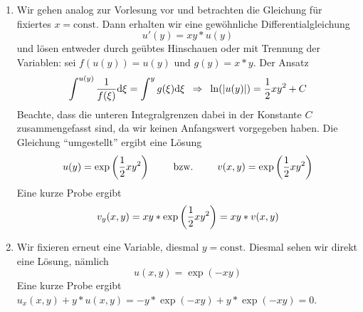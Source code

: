 \begin{exercisePage}
	\begin{enumerate}[label=(zu \alph*), leftmargin=*]
		\item Wir gehen analog zur Vorlesung vor und betrachten die Gleichung für fixiertes $x = \text{const}$. Dann erhalten wir eine gewöhnliche Differentialgleichung
		\begin{equation*}
			u'(y) = x y * u(y) 
		\end{equation*} und lösen entweder durch geübtes Hinschauen oder mit Trennung der Variablen: sei $f(u(y)) = u(y)$ und $g(y) = x*y$. Der Ansatz
		\begin{equation*}
			\int^{u(y)} \frac{1}{f(\xi)} \mathrm{d}{\xi} = \int^y g(\xi) \mathrm{d}{\xi} \enskip \Rightarrow \enskip \ln(\left| u(y) \right|) = \frac{1}{2} x y^2 + C
		\end{equation*} 
		Beachte, dass die unteren Integralgrenzen dabei in der Konstante $C$ zusammengefasst sind, da wir keinen Anfangswert vorgegeben haben. Die Gleichung \enquote{umgestellt} ergibt eine Lösung
		\begin{equation*}
			u(y) = \exp\left( \frac{1}{2}xy^2 \right) \qquad \text{ bzw. } \qquad v(x,y) = \exp\left( \frac{1}{2}xy^2 \right)
		\end{equation*}
		Eine kurze Probe ergibt
		\begin{equation*}
			v_y(x,y) = xy * \exp\left( \frac{1}{2}xy^2 \right) = xy * v(x,y)
		\end{equation*}
		\item Wir fixieren erneut eine Variable, diesmal $y = \text{const}$. Diesmal sehen wir direkt eine Lösung, nämlich
		\begin{equation*}
			u(x,y) = \exp(-xy)
		\end{equation*}
		Eine kurze Probe ergibt $u_x(x,y) + y * u(x,y) = -y * \exp(-xy) + y * \exp(-xy) = 0$.
	\end{enumerate}


\end{exercisePage}
